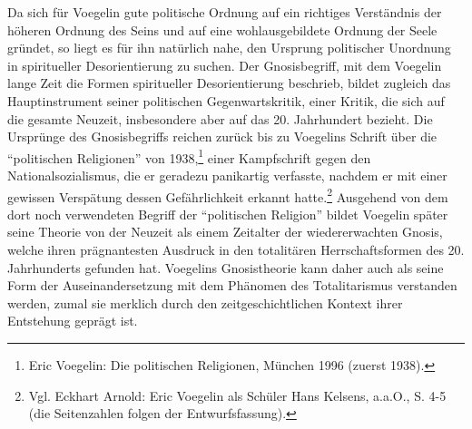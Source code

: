 Da sich für Voegelin gute politische Ordnung auf ein richtiges Verständnis der
höheren Ordnung des Seins und auf eine wohlausgebildete Ordnung der Seele
gründet, so liegt es für ihn natürlich nahe, den Ursprung politischer
Unordnung in spiritueller Desorientierung zu suchen. Der Gnosisbegriff, mit
dem Voegelin lange Zeit die Formen spiritueller Desorientierung beschrieb,
bildet zugleich das Hauptinstrument seiner politischen Gegenwartskritik, einer
Kritik, die sich auf die gesamte Neuzeit, insbesondere aber auf das 20.
Jahrhundert bezieht. Die Ursprünge des Gnosisbegriffs reichen zurück bis zu
Voegelins Schrift über die "`politischen Religionen"' von 1938,\footnote{Eric
  Voegelin: Die politischen Religionen, München 1996 (zuerst 1938).} einer
Kampfschrift gegen den Nationalsozialismus, die er geradezu panikartig
verfasste, nachdem er mit einer gewissen Verspätung dessen Gefährlichkeit
erkannt hatte.\footnote{Vgl.  Eckhart Arnold: Eric Voegelin als Schüler Hans
  Kelsens, a.a.O., S. 4-5 (die Seitenzahlen folgen der Entwurfsfassung).}
Ausgehend von dem dort noch verwendeten Begriff der "`politischen Religion"'
bildet Voegelin später seine Theorie von der Neuzeit als einem Zeitalter der
wiedererwachten Gnosis, welche ihren prägnantesten Ausdruck in den totalitären
Herrschaftsformen des 20. Jahrhunderts gefunden hat. Voegelins Gnosistheorie
kann daher auch als seine Form der Auseinandersetzung mit dem Phänomen des
Totalitarismus verstanden werden, zumal sie merklich durch den
zeitgeschichtlichen Kontext ihrer Entstehung geprägt ist.

